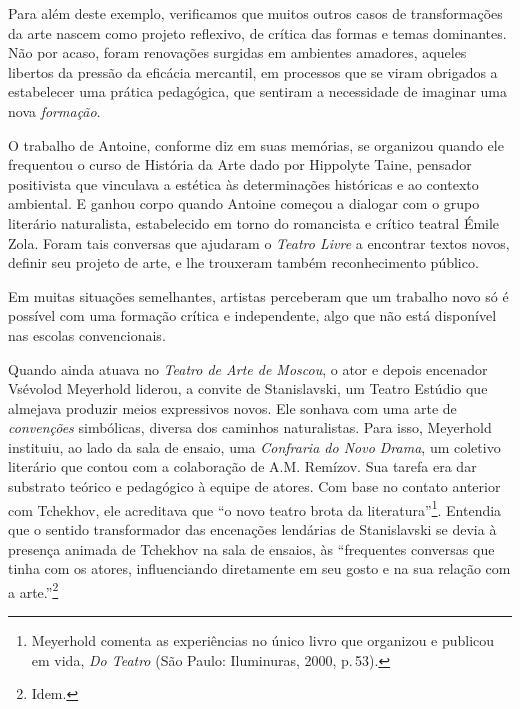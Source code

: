 Para além deste exemplo, verificamos que muitos outros casos de
transformações da arte nascem como projeto reflexivo, de crítica das
formas e temas dominantes. Não por acaso, foram renovações surgidas em
ambientes amadores, aqueles libertos da pressão da eficácia mercantil,
em processos que se viram obrigados a estabelecer uma prática
pedagógica, que sentiram a necessidade de imaginar uma nova
{\it formação}.

O trabalho de Antoine, conforme diz em suas memórias, se organizou
quando ele frequentou o curso de História da Arte dado por Hippolyte
Taine, pensador positivista que vinculava a estética às determinações
históricas e ao contexto ambiental. E ganhou corpo quando Antoine
começou a dialogar com o grupo literário naturalista, estabelecido em
torno do romancista e crítico teatral Émile Zola. Foram tais conversas
que ajudaram o {\it Teatro Livre} a encontrar textos novos, definir seu
projeto de arte, e lhe trouxeram também reconhecimento público.

Em muitas situações semelhantes, artistas perceberam que um trabalho
novo só é possível com uma formação crítica e independente, algo que não
está disponível nas escolas convencionais.

Quando ainda atuava no {\it Teatro de Arte de Moscou}, o ator e depois
encenador Vsévolod Meyerhold liderou, a convite de Stanislavski, um
Teatro Estúdio que almejava produzir meios expressivos novos. Ele
sonhava com uma arte de {\it convenções} simbólicas, diversa dos
caminhos naturalistas. Para isso, Meyerhold instituiu, ao lado da sala
de ensaio, uma {\it Confraria do Novo Drama}, um coletivo literário que
contou com a colaboração de A.M. Remízov. Sua tarefa era dar substrato
teórico e pedagógico à equipe de atores. Com base no contato anterior
com Tchekhov, ele acreditava que “o novo teatro brota da
literatura”\footnote{Meyerhold comenta as experiências no único livro
  que organizou e publicou em vida, {\it Do Teatro} (São Paulo:
  Iluminuras, 2000, p.\,53).}. Entendia que o sentido transformador das
encenações lendárias de Stanislavski se devia à presença animada de
Tchekhov na sala de ensaios, às “frequentes conversas que tinha com os
atores, influenciando diretamente em seu gosto e na sua relação com a
arte.”\footnote{Idem.}


